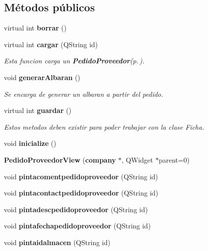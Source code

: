 \subsection*{M\'{e}todos p\'{u}blicos}
\begin{CompactItemize}
\item 
virtual int {\bf borrar} ()\label{classPedidoProveedorView_a0}

\item 
virtual int {\bf cargar} (QString id)\label{classPedidoProveedorView_a1}

\begin{CompactList}\small\item\em Esta funcion carga un {\bf Pedido\-Proveedor}{\rm (p.\,\pageref{classPedidoProveedor})}. \item\end{CompactList}\item 
void {\bf generar\-Albaran} ()
\begin{CompactList}\small\item\em Se encarga de generar un albaran a partir del pedido. \item\end{CompactList}\item 
virtual int {\bf guardar} ()\label{classPedidoProveedorView_a3}

\begin{CompactList}\small\item\em Estos metodos deben existir para poder trabajar con la clase Ficha. \item\end{CompactList}\item 
void {\bf inicialize} ()
\item 
{\bf Pedido\-Proveedor\-View} ({\bf company} $\ast$, QWidget $\ast$parent=0)
\item 
void {\bf pintacomentpedidoproveedor} (QString id)\label{classPedidoProveedorView_a6}

\item 
void {\bf pintacontactpedidoproveedor} (QString id)\label{classPedidoProveedorView_a7}

\item 
void {\bf pintadescpedidoproveedor} (QString id)\label{classPedidoProveedorView_a8}

\item 
void {\bf pintafechapedidoproveedor} (QString id)\label{classPedidoProveedorView_a9}

\item 
void {\bf pintaidalmacen} (QString id)\label{classPedidoProveedorView_a10}


\end{CompactItemize}
